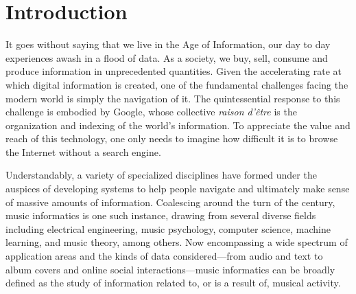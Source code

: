 

\graphicspath{{1/figures/}}

\chapter{Introduction}
\label{chp:introduction}

It goes without saying that we live in the Age of Information, our day to day experiences awash in a flood of data.
As a society, we buy, sell, consume and produce information in unprecedented quantities.
Given the accelerating rate at which digital information is created, one of the fundamental challenges facing the modern world is simply the navigation of it.
The quintessential response to this challenge is embodied by Google, whose collective \emph{raison d'\^etre} is the organization and indexing of the world's information.
To appreciate the value and reach of this technology, one only needs to imagine how difficult it is to browse the Internet without a search engine.




Understandably, a variety of specialized disciplines have formed under the auspices of developing systems to help people navigate and ultimately make sense of massive amounts of information.
Coalescing around the turn of the century, music informatics is one such instance, drawing from several diverse fields including electrical engineering, music psychology, computer science, machine learning, and music theory, among others.
Now encompassing a wide spectrum of application areas and the kinds of data considered---from audio and text to album covers and online social interactions---music informatics can be broadly defined as the study of information related to, or is a result of, musical activity.


